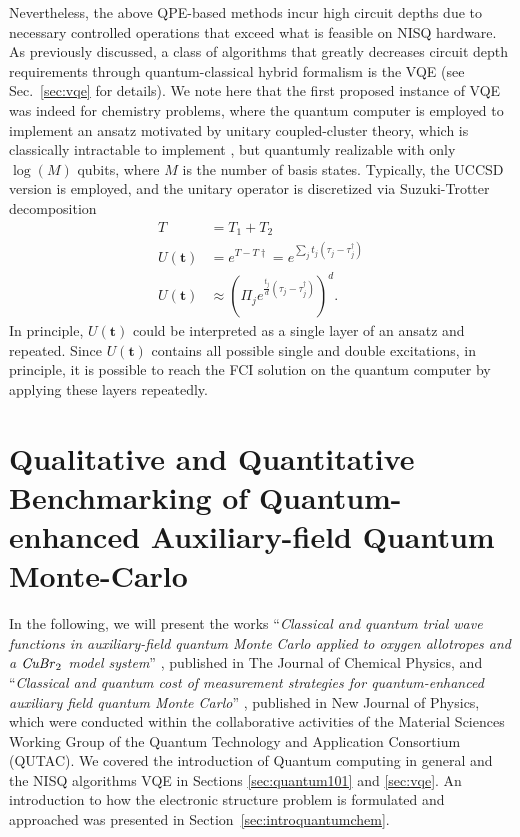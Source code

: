 \documentclass[../main.tex]{subfiles}
\begin{document}
Nevertheless, the above QPE-based methods incur high circuit depths due to necessary controlled operations that exceed what is feasible on NISQ hardware. As previously discussed, a class of algorithms that greatly decreases circuit depth requirements through quantum-classical hybrid formalism is the VQE (see Sec.~\ref{sec:vqe} for details). We note here that the first proposed instance of VQE was indeed for chemistry problems, where the quantum computer is employed to implement an ansatz motivated by unitary coupled-cluster theory, which is classically intractable to implement \cite{romero2018strategies, peruzzo2014variational}, but quantumly realizable with only $\log(M)$ qubits, where $M$ is the number of basis states.
Typically, the UCCSD version is employed, and the unitary operator is discretized via Suzuki-Trotter decomposition \cite{romero2018strategies}
\begin{align}
        T &= T_1 + T_2  \\
        U(\bm{t}) &= e^{T-T\dagger} = e^{\sum_j t_j (\tau_j - \tau^\dagger_j)}\\
        U(\bm{t}) &\approx (\Pi_j e^{\frac{t_j}{d}(\tau_j - \tau_j^\dagger)})^d .
\end{align}
In principle, $U(\mathbf{t})$ could be interpreted as a single layer of an ansatz and repeated. Since $U(\mathbf{t})$ contains all possible single and double excitations, in principle, it is possible to reach the FCI solution on the quantum computer by applying these layers repeatedly.



\section{Qualitative and Quantitative Benchmarking of Quantum-enhanced Auxiliary-field Quantum Monte-Carlo}

In the following, we will present the works ``\textit{Classical and quantum trial wave functions in auxiliary-field quantum Monte Carlo applied to oxygen allotropes and a $\text{\textit{CuBr}}_2$ model system}'' \cite{amsler2023classical}, published in The Journal of Chemical Physics, and ``\textit{Classical and quantum cost of measurement strategies for quantum-enhanced auxiliary field quantum Monte Carlo}'' \cite{kiser2024classical}, published in New Journal of Physics, which were conducted within the collaborative activities of the Material Sciences Working Group of the Quantum Technology and Application Consortium (QUTAC). We covered the introduction of Quantum computing in general and the NISQ algorithms VQE in Sections \ref{sec:quantum101} and \ref{sec:vqe}. An introduction to how the electronic structure problem is formulated and approached was presented in Section~\ref{sec:introquantumchem}. 
\end{document}
